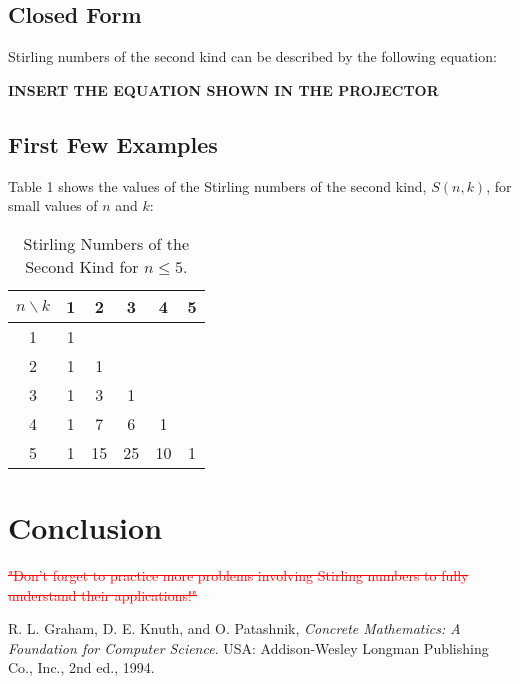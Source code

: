 \documentclass[11pt]{article}
\begin{document}
\subsection{Closed Form}
Stirling numbers of the second kind can be described by the following equation:

\textbf{INSERT THE EQUATION SHOWN IN THE PROJECTOR}

\subsection{First Few Examples}
Table 1 shows the values of the Stirling numbers of the second kind, $S(n, k)$, for small values of $n$ and $k$:

\begin{table}[h]
    \centering
    \begin{tabular}{|c|c|c|c|c|c|}
        \hline
        $n \backslash k$ & 1 & 2 & 3 & 4 & 5 \\ \hline
        1 & 1 &  &  &  &  \\ 
        2 & 1 & 1 &  &  &  \\ 
        3 & 1 & 3 & 1 &  &  \\ 
        4 & 1 & 7 & 6 & 1 &  \\ 
        5 & 1 & 15 & 25 & 10 & 1 \\ 
        \hline
    \end{tabular}
    \caption{Stirling Numbers of the Second Kind for $n \leq 5$.}
    \label{tab:stirling_numbers}
\end{table}


\section{Conclusion}

\textcolor{red}{\sout{"Don’t forget to practice more problems involving Stirling numbers to fully understand their applications!"}}


\begin{thebibliography}{9}
R. L. Graham, D. E. Knuth, and O. Patashnik, 
\textit{Concrete Mathematics: A Foundation for Computer Science}. USA: Addison-Wesley Longman Publishing Co., Inc., 2nd ed., 1994.
\end{thebibliography}
\end{document}
